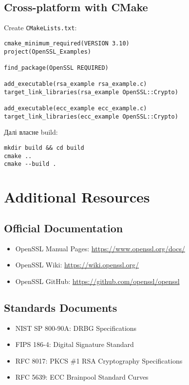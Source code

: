 \subsection{Cross-platform with CMake}
Create \texttt{CMakeLists.txt}:
\begin{verbatim}
cmake_minimum_required(VERSION 3.10)
project(OpenSSL_Examples)

find_package(OpenSSL REQUIRED)

add_executable(rsa_example rsa_example.c)
target_link_libraries(rsa_example OpenSSL::Crypto)

add_executable(ecc_example ecc_example.c)
target_link_libraries(ecc_example OpenSSL::Crypto)
\end{verbatim}

Далі власне build:
\begin{verbatim}
mkdir build && cd build
cmake ..
cmake --build .
\end{verbatim}

\section{Additional Resources}

\subsection{Official Documentation}
\begin{itemize}
    \item OpenSSL Manual Pages: \url{https://www.openssl.org/docs/}
    \item OpenSSL Wiki: \url{https://wiki.openssl.org/}
    \item OpenSSL GitHub: \url{https://github.com/openssl/openssl}
\end{itemize}

\subsection{Standards Documents}
\begin{itemize}
    \item NIST SP 800-90A: DRBG Specifications
    \item FIPS 186-4: Digital Signature Standard
    \item RFC 8017: PKCS \#1 RSA Cryptography Specifications
    \item RFC 5639: ECC Brainpool Standard Curves
\end{itemize}
